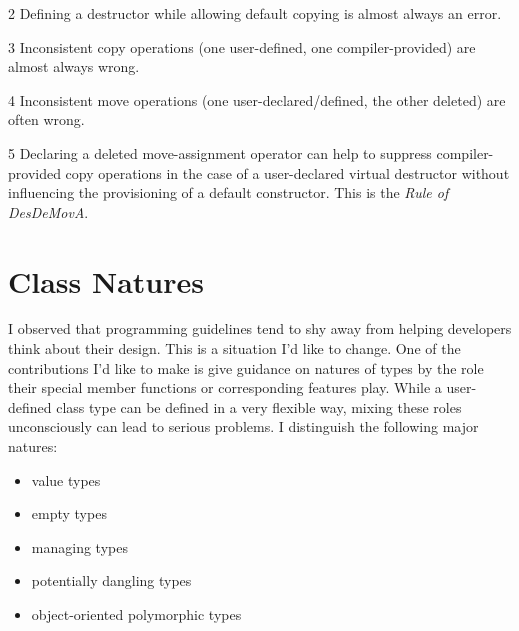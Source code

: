 \documentclass[ebook,11pt,article]{memoir}
\begin{document}
\begin{table}[htp]
\begin{center}
\begin{threeparttable}
\begin{tablenotes}
\item[2] Defining a destructor while allowing default copying is almost always an error.
\item[3] Inconsistent copy operations (one user-defined, one compiler-provided) are almost always wrong.
\item[4] Inconsistent move operations (one user-declared/defined, the other deleted) are often wrong.
\item[5] Declaring a deleted move-assignment operator can help to suppress compiler-provided copy operations in the case of a user-declared virtual destructor without influencing the provisioning of a default constructor. This is the \emph{Rule of DesDeMovA}.
\end{tablenotes}
\end{threeparttable}
\end{center}
\label{default}
\end{table}%


%
%


\chapter{Class Natures}
I observed that programming guidelines tend to shy away from helping developers think about their design.
This is a situation I'd like to change. One of the contributions I'd like to make is give guidance on natures of types by the role their special member functions or corresponding features play. While a user-defined class type can be defined in a very flexible way, mixing these roles unconsciously can lead to serious problems. 
I distinguish the following major natures:
\begin{itemize}
\item value types
\item empty types
\item managing types
\item potentially dangling types
\item object-oriented polymorphic types
\end{itemize}
\end{document}
